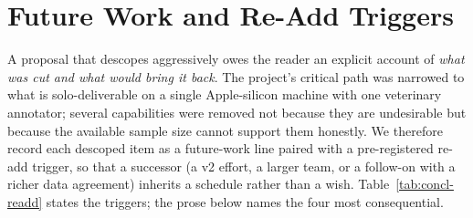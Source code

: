 \section{Future Work and Re-Add Triggers}
\label{sec:concl-future}

A proposal that descopes aggressively owes the reader an explicit account of
\emph{what was cut and what would bring it back}. The project's critical path was
narrowed to what is solo-deliverable on a single Apple-silicon machine with one
veterinary annotator; several capabilities were removed not because they are
undesirable but because the available sample size cannot support them honestly. We
therefore record each descoped item as a future-work line paired with a
pre-registered re-add trigger, so that a successor (a v2 effort, a larger team, or
a follow-on with a richer data agreement) inherits a schedule rather than a wish.
Table~\ref{tab:concl-readd} states the triggers; the prose below names the four
most consequential.


